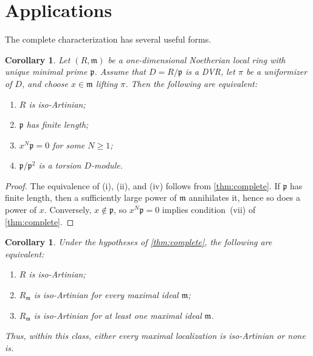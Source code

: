 \documentclass[11pt]{article}
\newtheorem{corollary}[theorem]{Corollary}
\theoremstyle{definition}
\begin{document}
\section{Applications}

The complete characterization has several useful forms.

\begin{corollary}\label{cor:dvr-local}
Let $(R,\mathfrak m)$ be a one-dimensional Noetherian local ring with unique minimal prime
$\mathfrak p$.  Assume that $D=R/\mathfrak p$ is a DVR, let $\pi$ be a uniformizer of $D$,
and choose $x\in\mathfrak m$ lifting $\pi$.  Then the following are equivalent:
\begin{enumerate}[label=\textup{(\roman*)}]
\item $R$ is iso-Artinian;
\item $\mathfrak p$ has finite length;
\item $x^N\mathfrak p=0$ for some $N\ge1$;
\item $\mathfrak p/\mathfrak p^2$ is a torsion $D$-module.
\end{enumerate}
\end{corollary}

\begin{proof}
The equivalence of (i), (ii), and (iv) follows from \cref{thm:complete}.  If $\mathfrak p$ has
finite length, then a sufficiently large power of $\mathfrak m$ annihilates it, hence so does a
power of $x$.  Conversely, $x\notin\mathfrak p$, so $x^N\mathfrak p=0$ implies condition~(vii) of
\cref{thm:complete}.
\end{proof}

\begin{corollary}\label{cor:local-global}
Under the hypotheses of \cref{thm:complete}, the following are equivalent:
\begin{enumerate}[label=\textup{(\roman*)}]
\item $R$ is iso-Artinian;
\item $R_{\mathfrak m}$ is iso-Artinian for every maximal ideal $\mathfrak m$;
\item $R_{\mathfrak m}$ is iso-Artinian for at least one maximal ideal $\mathfrak m$.
\end{enumerate}
Thus, within this class, either every maximal localization is iso-Artinian or none is.
\end{corollary}
\end{document}
